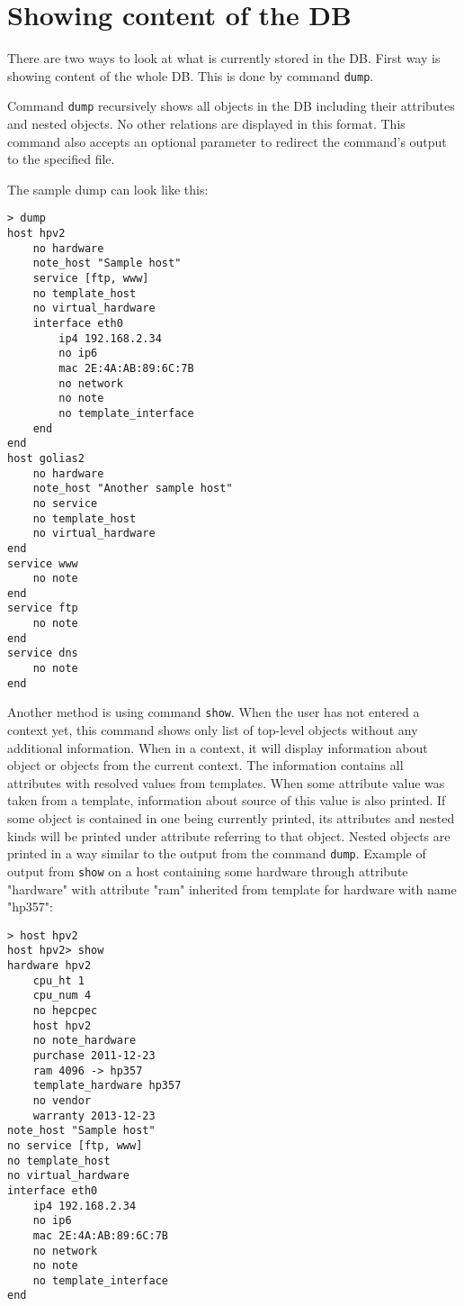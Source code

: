 \documentclass[deska]{subfiles}
\begin{document}
\section{Showing content of the DB}

There are two ways to look at what is currently stored in the DB. First way is showing content of the whole DB. This
is done by command {\tt dump}.

Command {\tt dump} recursively shows all objects in the DB including their attributes and nested objects. No other
relations are displayed in this format. This command also accepts an optional parameter to redirect the command's output
to the specified file.

The sample dump can look like this:
\begin{verbatim}
> dump
host hpv2
    no hardware
    note_host "Sample host"
    service [ftp, www]
    no template_host
    no virtual_hardware
    interface eth0
        ip4 192.168.2.34
        no ip6
        mac 2E:4A:AB:89:6C:7B
        no network
        no note
        no template_interface
    end
end
host golias2
    no hardware
    note_host "Another sample host"
    no service
    no template_host
    no virtual_hardware
end
service www
    no note
end
service ftp
    no note
end
service dns
    no note
end
\end{verbatim}

Another method is using command {\tt show}. When the user has not entered a context yet, this command shows only list of top-level objects without any
additional information. When in a context, it will display information about object or objects from the current context. The
information contains all attributes with resolved values from templates. When some attribute value was taken from
a template, information about source of this value is also printed. If some object is contained in one being currently
printed, its attributes and nested kinds will be printed under attribute referring to that object. Nested objects are
printed in a way similar to the output from the command {\tt dump}. Example of output from {\tt show} on a host containing some hardware
through attribute "hardware" with attribute "ram" inherited from template for hardware with name "hp357":

\begin{verbatim}
> host hpv2
host hpv2> show
hardware hpv2
    cpu_ht 1
    cpu_num 4
    no hepcpec
    host hpv2
    no note_hardware
    purchase 2011-12-23
    ram 4096 -> hp357
    template_hardware hp357
    no vendor
    warranty 2013-12-23
note_host "Sample host"
no service [ftp, www]
no template_host
no virtual_hardware
interface eth0
    ip4 192.168.2.34
    no ip6
    mac 2E:4A:AB:89:6C:7B
    no network
    no note
    no template_interface
end
\end{verbatim}
\end{document}
